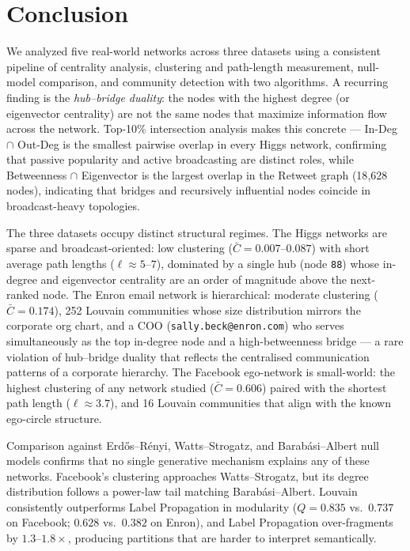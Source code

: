 \section{Conclusion}
\label{sec:conclusion}

We analyzed five real-world networks across three datasets using a
consistent pipeline of centrality analysis, clustering and path-length
measurement, null-model comparison, and community detection with two
algorithms.
A recurring finding is the \textit{hub--bridge duality}: the nodes with the
highest degree (or eigenvector centrality) are not the same nodes that
maximize information flow across the network.
Top-10\% intersection analysis makes this concrete — In-Deg $\cap$ Out-Deg
is the smallest pairwise overlap in every Higgs network, confirming that
passive popularity and active broadcasting are distinct roles, while
Betweenness $\cap$ Eigenvector is the largest overlap in the Retweet graph
(18{,}628 nodes), indicating that bridges and recursively influential nodes
coincide in broadcast-heavy topologies.

The three datasets occupy distinct structural regimes.
The Higgs networks are sparse and broadcast-oriented: low clustering
($\bar{C} = 0.007$--$0.087$) with short average path lengths
($\ell \approx 5$--$7$), dominated by a single hub (node \texttt{88}) whose
in-degree and eigenvector centrality are an order of magnitude above the
next-ranked node.
The Enron email network is hierarchical: moderate clustering
($\bar{C} = 0.174$), 252 Louvain communities whose size distribution mirrors
the corporate org chart, and a COO (\texttt{sally.beck@enron.com}) who serves
simultaneously as the top in-degree node and a high-betweenness bridge — a
rare violation of hub--bridge duality that reflects the centralised
communication patterns of a corporate hierarchy.
The Facebook ego-network is small-world: the highest clustering of any
network studied ($\bar{C} = 0.606$) paired with the shortest path length
($\ell \approx 3.7$), and 16 Louvain communities that align with the known
ego-circle structure.

Comparison against Erd\H{o}s--R\'enyi, Watts--Strogatz, and
Barab\'asi--Albert null models confirms that no single generative mechanism
explains any of these networks.
Facebook's clustering approaches Watts--Strogatz, but its degree distribution
follows a power-law tail matching Barab\'asi--Albert.
Louvain consistently outperforms Label Propagation in modularity
($Q = 0.835$ vs.\ $0.737$ on Facebook; $0.628$ vs.\ $0.382$ on Enron),
and Label Propagation over-fragments by $1.3$--$1.8\times$, producing
partitions that are harder to interpret semantically.

